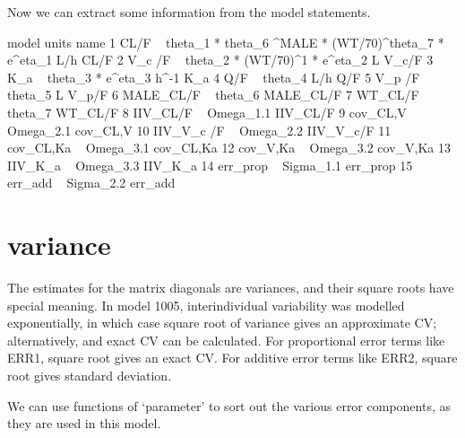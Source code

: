 Now we can extract some information from the model statements.
\begin{Schunk}
\begin{Soutput}
                                                          model units      name
1  CL/F  ~ theta_1 * theta_6 ^MALE * (WT/70)^theta_7  * e^eta_1   L/h      CL/F
2                       V_c /F  ~ theta_2 * (WT/70)^1 * e^eta_2     L     V_c/F
3                                      K_a  ~ theta_3 * e^eta_3 h^-1        K_a
4                                                Q/F  ~ theta_4   L/h       Q/F
5                                             V_p /F  ~ theta_5     L     V_p/F
6                                           MALE_CL/F ~ theta_6       MALE_CL/F
7                                             WT_CL/F ~ theta_7         WT_CL/F
8                                          IIV_CL/F ~ Omega_1.1        IIV_CL/F
9                                          cov_CL,V ~ Omega_2.1        cov_CL,V
10                                       IIV_V_c /F ~ Omega_2.2       IIV_V_c/F
11                                       cov_CL,Ka  ~ Omega_3.1       cov_CL,Ka
12                                        cov_V,Ka  ~ Omega_3.2        cov_V,Ka
13                                         IIV_K_a  ~ Omega_3.3         IIV_K_a
14                                         err_prop ~ Sigma_1.1        err_prop
15                                          err_add ~ Sigma_2.2         err_add
\end{Soutput}
\end{Schunk}
\section{variance}
The estimates for the matrix diagonals are variances, and their square roots have special meaning.  In model 1005, interindividual variability was modelled exponentially, in which case square root of variance gives an approximate CV; alternatively, and exact CV can be calculated.  For proportional error terms like ERR1, square root gives an exact CV.  For additive error terms like ERR2, square root gives standard deviation.

We can use functions of `parameter' to sort out the various error components, as they are used in this model. 
